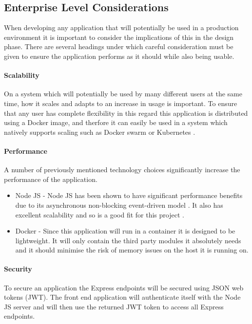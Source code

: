 \subsection{Enterprise Level Considerations}
When developing any application that will potentially be used in a production environment it is important to consider the implications of this in the design phase. There are several headings under which careful consideration must be given to ensure the application performs as it should while also being usable.

\paragraph{Scalability}
On a system which will potentially be used by many different users at the same time, how it scales and adapts to an increase in usage is important. To ensure that any user has complete flexibility in this regard this application is distributed using a \gls{Docker image}, and therfore it can easily be used in a system which natively supports scaling such as Docker swarm or Kubernetes \citep{DockerSwarm2017,Kubernetes2017}.

\paragraph{Performance}
A number of previously mentioned technology choices significantly increase the performance of the application. 

\begin{itemize}
	\item Node JS - Node JS has been shown to have significant performance benefits due to its asynchronous non-blocking event-driven model \citep{NodePerformance2010}. It also has excellent scalability and so is a good fit for this project \citep{Griffin2011}.
	\item Docker - Since this application will run in a container it is designed to be lightweight. It will only contain the third party modules it absolutely needs and it should minimise the risk of memory issues on the host it is running on.
\end{itemize}

\paragraph{Security}
To secure an application the Express endpoints will be secured using JSON web tokens (\gls{JWT}). The front end application will authenticate itself with the Node JS server and will then use the returned JWT token to access all Express endpoints. 

